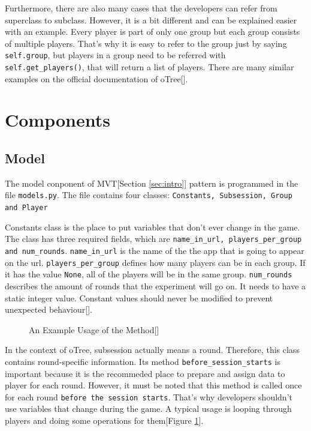 Furthermore, there are also many cases that the developers can refer from superclass to subclass. However, it is a bit different and can be explained easier with an example. Every player is part of only one group but each group consists of multiple players. That's why it is easy to refer to the group just by saying \verb|self.group|, but players in a group need to be referred with \verb|self.get_players()|, that will return a list of players. There are many similar examples on the official documentation of oTree[\cite{oTreeConcepts2017}]. 

\section{Components}

\subsection{Model}\label{sub:model}

The model conponent of MVT[Section \ref{sec:intro}] pattern is programmed in the file \verb|models.py|. The file contains four classes: \verb|Constants, Subsession, Group and Player| 

Constants class is the place to put variables that don't ever change in the game. The class has three required fields, which are \verb|name_in_url, players_per_group and num_rounds|. \verb|name_in_url| is the name of the the app that is going to appear on the url. \verb|players_per_group| defines how many players can be in each group. If it has the value \verb|None|, all of the players will be in the same group. \verb|num_rounds| describes the amount of rounds that the experiment will go on. It needs to have a static integer value. Constant values should never be modified to prevent unexpected behaviour[\cite{oTreeModel2017}]. 

\begin{figure}[h]
	\centerline{}
	\caption{An Example Usage of the Method[\cite{oTreeModel2017}]}
	\label{fig:picture7}
	
\end{figure}

In the context of oTree, subsession actually means a round. Therefore, this class contains round-specific information. Its method \verb|before_session_starts| is important because it is the recommeded place to prepare and assign data to  player for each round. However, it must be noted that this method is called once for each round \verb|before the session starts|. That's why developers shouldn't use variables that change during the game.  A typical usage is looping through players and doing some operations for them[Figure \ref{fig:picture7}].

